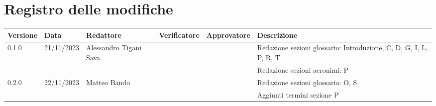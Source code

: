 \section*{Registro delle modifiche}
{
\renewcommand{\arraystretch}{1.5}
\scriptsize
\begin{tabularx}{\textwidth}{lllllX}
	\textbf{Versione} & \textbf{Data} & \textbf{Redattore} 		& \textbf{Verificatore} & \textbf{Approvatore} 	& \textbf{Descrizione}\\
	\hline
	0.1.0			  & 21/11/2023    & Alessandro Tigani Sava	& 			 			& 		 			   	& Redazione sezioni glossario: Introduzione, C, D, G, I, L, P, R, T    \\
				 	  &     		  & 						& 			 			& 		 			   	& Redazione sezioni acronimi: P \\
	0.2.0			  & 22/11/2023    & Matteo Bando            &                       &                       & Redazione sezioni glossario: O, S \\
	                  &               &                         &                       &                       & Aggiunti termini sezione P \\
	\hline
\end{tabularx}
}

